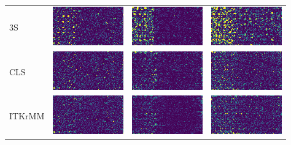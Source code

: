 \begin{tabular}{m{2cm}*{3}{M{0.24\textwidth}}}
    3S&
    \includegraphics[width=\tmplength]{img/chapitre4/figure7/R2_3S_band_0.png}&
    \includegraphics[width=\tmplength]{img/chapitre4/figure7/R2_3S_band_1.png}&
    \includegraphics[width=\tmplength]{img/chapitre4/figure7/R2_3S_band_2.png}\\
    CLS&
    \includegraphics[width=\tmplength]{img/chapitre4/figure7/R2_CLS_band_0.png}&
    \includegraphics[width=\tmplength]{img/chapitre4/figure7/R2_CLS_band_1.png}&
    \includegraphics[width=\tmplength]{img/chapitre4/figure7/R2_CLS_band_2.png}\\
    ITKrMM&
    \includegraphics[width=\tmplength]{img/chapitre4/figure7/R2_ITKrMM_band_0.png}&
    \includegraphics[width=\tmplength]{img/chapitre4/figure7/R2_ITKrMM_band_1.png}&
    \includegraphics[width=\tmplength]{img/chapitre4/figure7/R2_ITKrMM_band_2.png}\\

\end{tabular}
